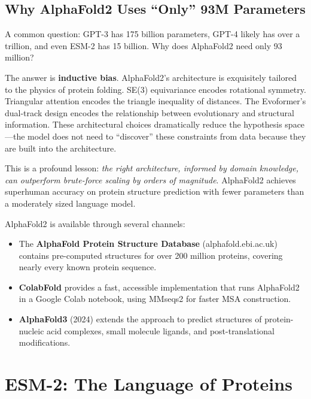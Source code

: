 \subsection{Why AlphaFold2 Uses ``Only'' 93M Parameters}

A common question: GPT-3 has 175 billion parameters, GPT-4 likely has over a trillion, and even ESM-2 has 15 billion. Why does AlphaFold2 need only 93 million?

The answer is \textbf{inductive bias}. AlphaFold2's architecture is exquisitely tailored to the physics of protein folding. SE(3) equivariance encodes rotational symmetry. Triangular attention encodes the triangle inequality of distances. The Evoformer's dual-track design encodes the relationship between evolutionary and structural information. These architectural choices dramatically reduce the hypothesis space---the model does not need to ``discover'' these constraints from data because they are built into the architecture.

This is a profound lesson: \emph{the right architecture, informed by domain knowledge, can outperform brute-force scaling by orders of magnitude}. AlphaFold2 achieves superhuman accuracy on protein structure prediction with fewer parameters than a moderately sized language model.

\begin{implnote}
AlphaFold2 is available through several channels:
\begin{itemize}[leftmargin=1.5em]
  \item The \textbf{AlphaFold Protein Structure Database} (alphafold.ebi.ac.uk) contains pre-computed structures for over 200 million proteins, covering nearly every known protein sequence.
  \item \textbf{ColabFold} provides a fast, accessible implementation that runs AlphaFold2 in a Google Colab notebook, using MMseqs2 for faster MSA construction.
  \item \textbf{AlphaFold3} (2024) extends the approach to predict structures of protein-nucleic acid complexes, small molecule ligands, and post-translational modifications.
\end{itemize}
\end{implnote}

\section{ESM-2: The Language of Proteins}
\label{sec:protein-lms}

